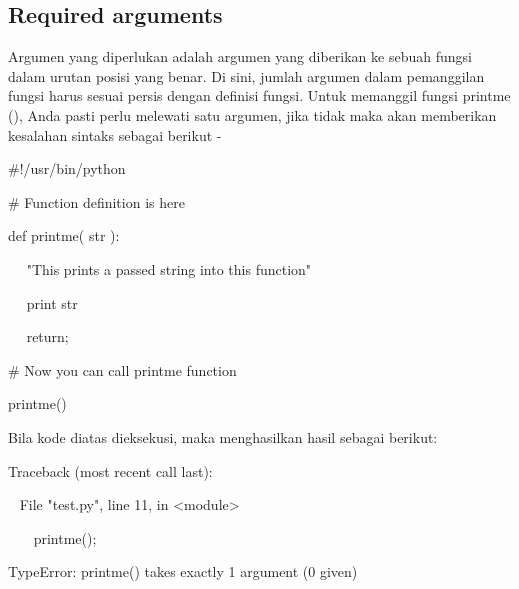 \documentclass[a4paper,12pt]{report}
\begin{document}
\subsection*{Required arguments}
 \par
\begin{adjustwidth}{0.03in}{0.03in}
Argumen yang diperlukan adalah argumen yang diberikan ke sebuah fungsi dalam urutan posisi yang benar. Di sini, jumlah argumen dalam pemanggilan fungsi harus sesuai persis dengan definisi fungsi. Untuk memanggil fungsi printme (), Anda pasti perlu melewati satu argumen, jika tidak maka akan memberikan kesalahan sintaks sebagai berikut -\end{adjustwidth}
 \par
\noindent 
 \hspace*{0.5in}  $  \#  $!/usr/bin/python \par
\vspace{12pt}
\noindent 
 \hspace*{0.5in}  $  \#  $ Function definition is here \par
\noindent 
 \hspace*{0.5in} def printme( str ): \par
\noindent 
~~  \hspace*{0.5in}  \hspace*{0.5in} "This prints a passed string into this function" \par
\noindent 
~~  \hspace*{0.5in} print str \par
\noindent 
~~  \hspace*{0.5in} return; \par
\vspace{12pt}
\noindent 
 \hspace*{0.5in}  $  \#  $ Now you can call printme function \par
\noindent 
 \hspace*{0.5in} printme() \par
\begin{adjustwidth}{0.03in}{0.03in}
Bila kode diatas dieksekusi, maka menghasilkan hasil sebagai berikut:\end{adjustwidth}
 \par
\noindent 
 \hspace*{0.5in} Traceback (most recent call last): \par
\noindent 
 \hspace*{0.5in} ~ File "test.py", line 11, in <module> \par
\noindent 
 \hspace*{0.5in} ~~~ printme(); \par
\noindent 
 \hspace*{0.5in} TypeError: printme() takes exactly 1 argument (0 given) \par
\vspace{20pt}
\end{document}
